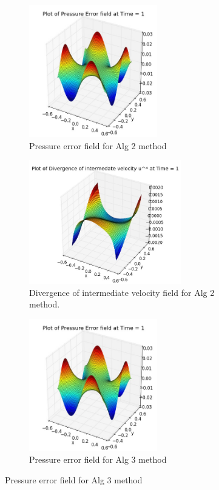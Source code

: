 \begin{figure}[H]
	\centering
	\begin{subfigure}[t]{2.2in}
		\centering
		\includegraphics[width=2.2in]{figures/Pm1b_pf2b_P_error_t_1_grid_60.jpg}
		\caption{Pressure error field for Alg 2 method}\label{fig:6.19a}		
	\end{subfigure}
	\quad
	\begin{subfigure}[t]{2.6in}
		\centering
		\includegraphics[width=2.6in]{figures/Pm1b_pf2b_div_uvstar_t_1_grid_60.jpg}
		\caption{Divergence of intermediate velocity field for Alg 2 method. }\label{fig:6.19b}
	\end{subfigure}
	\quad
	\centering
	\begin{subfigure}[t]{2.2in}
		\centering
		\includegraphics[width=2.2in]{figures/Pm2_pf2b_np_P_error_t_1_grid_60.jpg}
		\caption{Pressure error field for Alg 3 method}\label{fig:6.19c}		
	\end{subfigure}

\end{figure}

